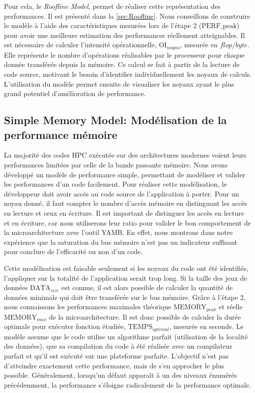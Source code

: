     
    Pour cela, le \textit{Roofline Model}, permet de réaliser cette représentation des performances. Il est présenté dans la \autoref{sec:Roofline}. Nous conseillons de construire le modèle à l'aide des caractéristiques mesurées lors de l'étape 2 ($\text{PERF_{peak}}$) pour avoir une meilleure estimation des performances réellement atteignables. 
    Il est nécessaire de calculer l'intensité opérationnelle, $\text{OI}_{noyau}$, mesurée en $flop/byte$. Elle représente le nombre d'opérations réalisables par le processeur pour chaque donnée transférée depuis la mémoire. Ce calcul se fait à partir de la lecture de code source, motivant le besoin d'identifier individuellement les noyaux de calculs. 
    L'utilisation du modèle permet ensuite de visualiser les noyaux ayant le plus grand potentiel d'amélioration de performance. 


\subsection{Simple Memory Model: Modélisation de la performance mémoire} \label{sec:smm}

    La majorité des codes HPC exécutée sur des architectures modernes voient leurs performances limitées par celle de la bande passante mémoire. Nous avons développé un modèle de performance simple, permettant de modéliser et valider les performances d'un code facilement. Pour réaliser cette modélisation, le développeur doit avoir accès au code source de l'application à porter. Pour un noyau donné, il faut compter le nombre d'accès mémoire en distinguant les accès en lecture et ceux en écriture. Il est important de distinguer les accès en lecture et en écriture, car nous utiliserons leur ratio pour valider le bon comportement de la microarchitecture avec l'outil YAMB. En effet, nous montrons dans notre expérience que la saturation du bus mémoire n'est pas un indicateur suffisant pour conclure de l'efficacité ou non d'un code.
    
    Cette modélisation est faisable seulement si les noyaux du code ont été identifiés, l'appliquer sur la totalité de l'application serait trop long. Si la taille des jeux de données $\text{DATA}_{size}$ est connue, il est alors possible de calculer la quantité de données minimale qui doit être transférée sur le bus mémoire. Grâce à l'étape 2, nous connaissons les performances maximales théorique $\text{MEMORY}_{peak}$ et réelle $\text{MEMORY}_{max}$ de la microarchitecture. Il est donc possible de calculer la durée optimale pour exécuter fonction étudiée, $\text{TEMPS}_{optimal}$, mesurée en seconde. Le modèle assume que le code utilise un algorithme parfait (utilisation de la localité des données), que sa compilation du code à été réalisée avec un compilateur parfait et qu'il est exécuté sur une plateforme parfaite. L'objectif n'est pas d'atteindre exactement cette performance, mais de s'en approcher le plus possible. Généralement, lorsqu'un défaut apparaît à un des niveaux énumérés précédemment, la performance s'éloigne radicalement de la performance optimale.
    
